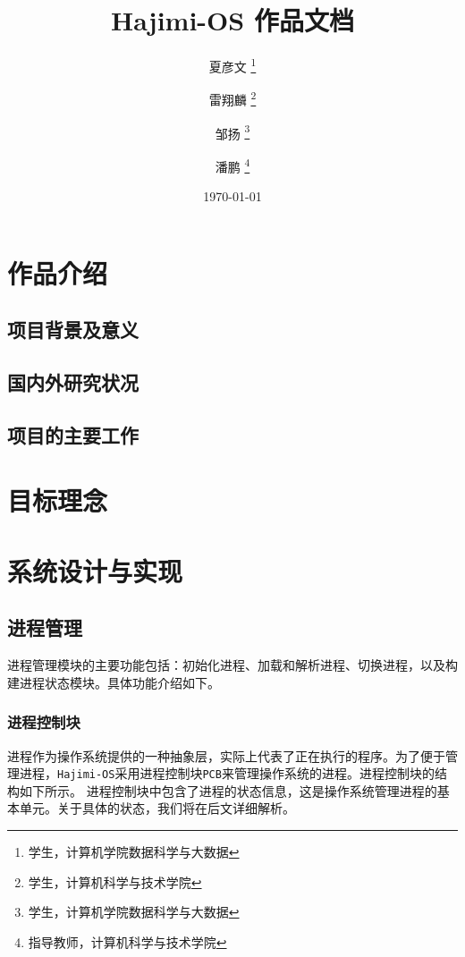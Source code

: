 \documentclass[UTF8]{article}
\begin{document}
\title{\Huge Hajimi-OS 作品文档}
\author{夏彦文 \thanks{学生，计算机学院数据科学与大数据} \and 雷翔麟 \thanks{学生，计算机科学与技术学院}
  \and 邹扬 \thanks{学生，计算机学院数据科学与大数据} \and 潘鹏 \thanks{指导教师，计算机科学与技术学院}}
\date{\today}
\maketitle

\newpage
\tableofcontents
\newpage


\section{作品介绍}
\subsection{项目背景及意义}
\subsection{国内外研究状况}
\subsection{项目的主要工作}
\section{目标理念}

\section{系统设计与实现}
\subsection{进程管理}
进程管理模块的主要功能包括：初始化进程、加载和解析进程、切换进程，以及构建进程状态模块。具体功能介绍如下。
\subsubsection{进程控制块}
进程作为操作系统提供的一种抽象层，实际上代表了正在执行的程序。为了便于管理进程，\texttt{Hajimi-OS}采用进程控制块\texttt{PCB}来管理操作系统的进程。进程控制块的结构如下所示。
进程控制块中包含了进程的状态信息，这是操作系统管理进程的基本单元。关于具体的状态，我们将在后文详细解析。

\end{document}
